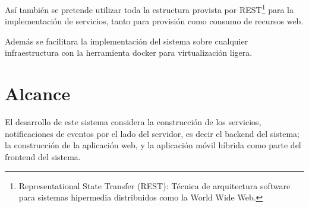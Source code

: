 \documentclass[letterpaper,11pt]{article}
\begin{document}
Así también se pretende utilizar toda la estructura provista por
REST\footnote{Representational State Transfer (REST): Técnica de arquitectura
software para sistemas hipermedia distribuidos como la World Wide Web.} para la
implementación de servicios, tanto para provisión como consumo de recursos web.

Además se facilitara la implementación del sistema sobre cualquier
infraestructura con la herramienta docker para virtualización ligera.

\section{Alcance}
El desarrollo de este sistema considera la construcción de los servicios,
notificaciones de eventos por el lado del servidor, es decir el backend del
sistema; la construcción de la aplicación web, y la aplicación móvil híbrida
como parte del frontend del sistema.
\end{document}
